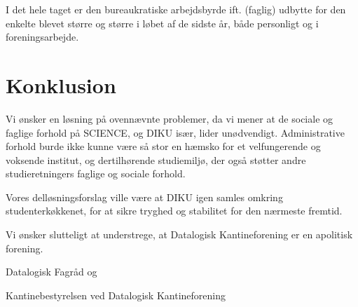 \documentclass{article}
\begin{document}
I det hele taget er den bureaukratiske arbejdsbyrde ift. (faglig) udbytte for
den enkelte blevet større og større i løbet af de sidste år, både personligt og
i foreningsarbejde.

\section{Konklusion}

Vi ønsker en løsning på ovennævnte problemer, da vi mener at de sociale og
faglige forhold på SCIENCE, og DIKU især, lider unødvendigt. Administrative
forhold burde ikke kunne være så stor en hæmsko for et velfungerende og
voksende institut, og dertilhørende studiemiljø, der også støtter andre
studieretningers faglige og sociale forhold.

Vores delløsningsforslag ville være at DIKU igen samles omkring
studenterkøkkenet, for at sikre tryghed og stabilitet for den nærmeste
fremtid.

Vi ønsker slutteligt at understrege, at Datalogisk Kantineforening er en
apolitisk forening.
\vspace*{0.5cm}

Datalogisk Fagråd og

Kantinebestyrelsen ved Datalogisk Kantineforening\\
\end{document}
